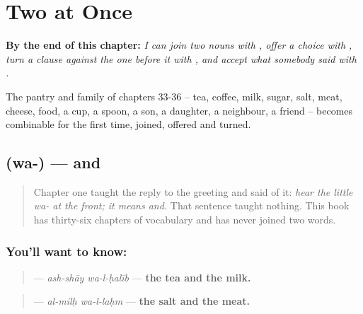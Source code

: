 
\chapter{Two at Once}
\label{ch:ar-two-at-once}

\begin{chapteropening}
\textbf{By the end of this chapter:} \emph{I can join two nouns with , offer a choice with , turn a clause against the one before it with , and accept what somebody said with .}

The pantry and family of chapters 33-36 -- tea, coffee, milk, sugar, salt, meat, cheese, food, a cup, a spoon, a son, a daughter, a neighbour, a friend -- becomes combinable for the first time, joined, offered and turned.
\end{chapteropening}

\section[\texorpdfstring{\ar{و} (wa-)}{و (wa-)}]{ (wa-) — and}

\label{lesson:AR-C38-wa}



\begin{quote}
Chapter one taught the reply to the greeting and said of it: \emph{hear the little wa- at the front; it means and.} That sentence taught nothing. This book has thirty-six chapters of vocabulary and has never joined two words.
\end{quote}

\subsection*{You'll want to know: }
\begin{quote}
\textbf{ } — \emph{ash-shāy wa-l-ḥalīb} — \textbf{the tea and the milk.}
\end{quote}

\begin{quote}
\textbf{ } — \emph{al-milḥ wa-l-laḥm} — \textbf{the salt and the meat.}
\end{quote}

